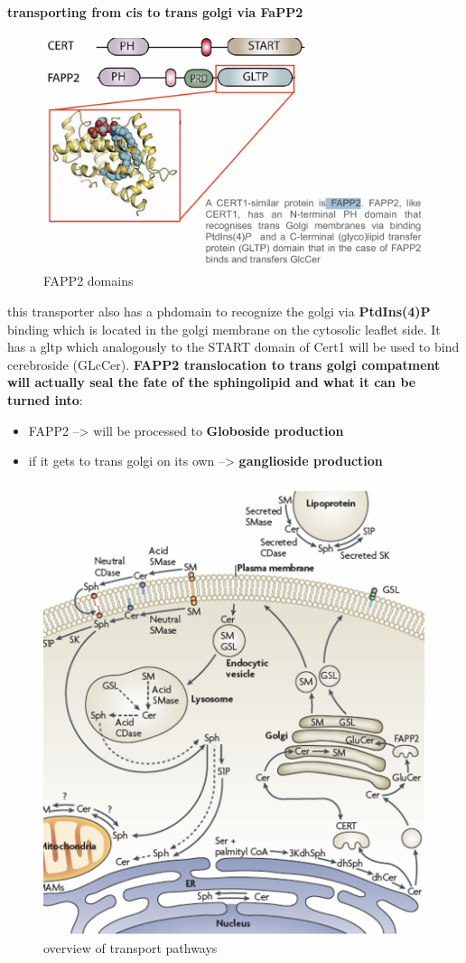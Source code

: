 \documentclass[../main.tex]{subfiles}
\begin{document}
\paragraph{transporting from cis to trans golgi via FaPP2}
\begin{figure}[H]
    \centering
    \includegraphics[width=0.5\linewidth]{FAPP2.png}
    \caption{FAPP2 domains}
    \label{fig:enter-label}
\end{figure}
this transporter also has a \gls{phdomain} to recognize the golgi via \textbf{PtdIns(4)P } binding which is located in the golgi membrane on the cytosolic leaflet side. It has a \gls{gltp} which analogously to the START domain of Cert1 will be used to bind cerebroside (GLcCer). \textbf{FAPP2 translocation to trans golgi compatment will actually seal the fate of the sphingolipid and what it can be turned into}: 
\begin{itemize}
    \item FAPP2 --> will be processed to \textbf{Globoside production}
    \item if it gets to trans golgi on its own --> \textbf{ganglioside production}
\end{itemize}
\begin{figure}[H]
    \centering
    \includegraphics[width=0.4\linewidth]{transport.png}
    \caption{overview of transport pathways}
    \label{fig:enter-label}
\end{figure}
\end{document}
